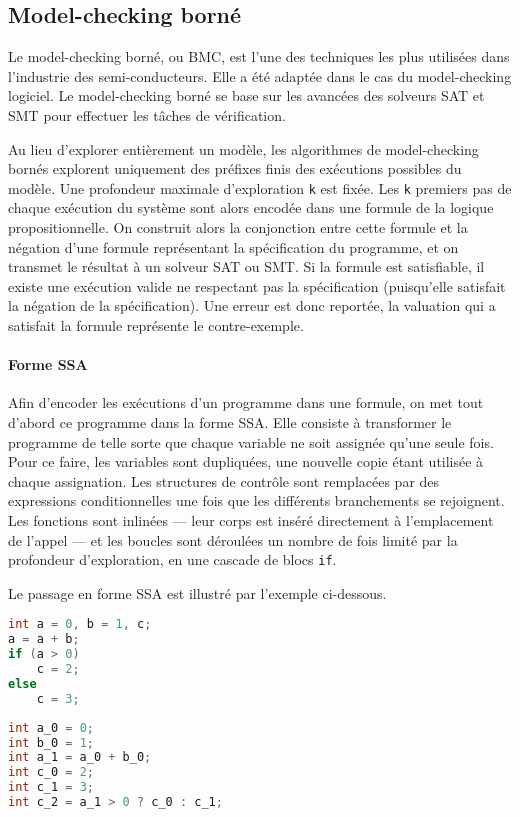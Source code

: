 \subsection{Model-checking borné}

Le model-checking borné, ou \ac{BMC}, est l'une des
techniques les plus utilisées dans l'industrie des semi-conducteurs. Elle a été
adaptée dans le cas du model-checking logiciel. Le model-checking borné se base
sur les avancées des solveurs SAT et SMT pour effectuer les tâches de
vérification.

Au lieu d'explorer entièrement un modèle, les algorithmes de model-checking
bornés explorent uniquement des préfixes finis des exécutions possibles du
modèle. Une profondeur maximale d'exploration \texttt{k} est fixée.
Les \texttt{k} premiers pas de chaque exécution du système sont alors
encodée dans une formule de la logique propositionnelle.
On construit alors la conjonction entre cette formule et la négation d'une
formule représentant la spécification du programme, et on transmet le résultat
à un solveur SAT ou SMT. Si la formule est satisfiable, il existe une
exécution valide ne respectant pas la spécification (puisqu’elle satisfait la
négation de la spécification). Une erreur est donc reportée, la valuation qui a
satisfait la formule représente le contre-exemple.

\paragraph{Forme SSA}
Afin d'encoder les exécutions d'un programme dans une
formule, on met tout d'abord ce programme dans la forme \ac{SSA}.
Elle consiste à transformer le programme de telle sorte que chaque
variable ne soit assignée qu'une seule fois. Pour ce faire, les variables sont
dupliquées, une nouvelle copie étant utilisée à chaque assignation. Les
structures de contrôle sont remplacées par des expressions conditionnelles une
fois que les différents branchements se rejoignent. Les fonctions sont inlinées
--- leur corps est inséré directement à l'emplacement de l'appel --- et les
boucles sont déroulées un nombre de fois limité par la profondeur d'exploration,
en une cascade de blocs \texttt{if}.

Le passage en forme \ac{SSA} est illustré par l'exemple ci-dessous.

\noindent\begin{minipage}{.45\textwidth}
\begin{lstlisting}[language=C, caption=Code initial, frame=tlrb]
int a = 0, b = 1, c;
a = a + b;
if (a > 0)
    c = 2;
else
    c = 3;
\end{lstlisting}
\end{minipage}\hfill
\begin{minipage}{.45\textwidth}
\begin{lstlisting}[language=C, caption=Forme SSA,frame=tlrb]
int a_0 = 0;
int b_0 = 1;
int a_1 = a_0 + b_0;
int c_0 = 2;
int c_1 = 3;
int c_2 = a_1 > 0 ? c_0 : c_1;
\end{lstlisting}
\end{minipage}

